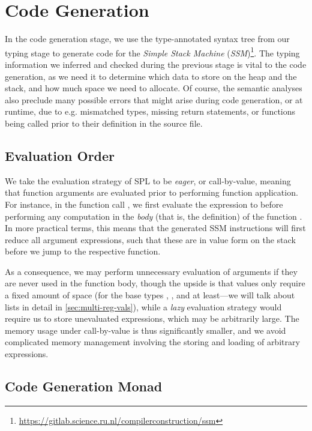 \chapter{Code Generation}

In the code generation stage, we use the type-annotated syntax tree from our
typing stage to generate code for the \emph{Simple Stack Machine}
(\emph{SSM})\footnote{\url{https://gitlab.science.ru.nl/compilerconstruction/ssm}}.
The typing information we inferred and checked during the previous stage is
vital to the code generation, as we need it to determine which data to store on
the heap and the stack, and how much space we need to allocate.
Of course, the semantic analyses also preclude many possible errors that might
arise during code generation, or at runtime, due to e.g. mismatched types,
missing return statements, or functions being called prior to their definition
in the source file.


\section{Evaluation Order}

We take the evaluation strategy of SPL to be \emph{eager}, or call-by-value,
meaning that function arguments are evaluated prior to performing function
application. For instance, in the function call , we first evaluate
the expression  to  before performing any computation in the
\emph{body} (that is, the definition) of the function .
In more practical terms, this means that the generated SSM instructions will
first reduce all argument expressions, such that these are in value form on the
stack before we jump to the respective function.

As a consequence, we may perform unnecessary evaluation of arguments if they are
never used in the function body, though the upside is that values only require
a fixed amount of space (for the base types , , and
 at least---we will talk about lists in detail in
\cref{sec:multi-reg-vals}), while a \emph{lazy} evaluation strategy would
require us to store unevaluated expressions, which may be arbitrarily large.
The memory usage under call-by-value is thus significantly smaller, and we avoid
complicated memory management involving the storing and loading of arbitrary
expressions.



\section{Code Generation Monad} \label{sec:codegen-monad}

